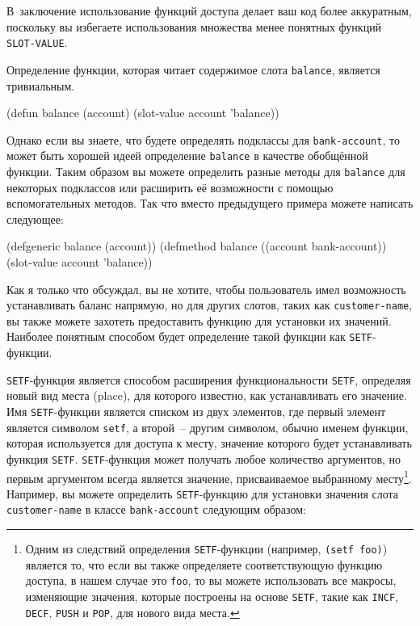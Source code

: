 В~заключение использование функций доступа делает ваш код более аккуратным, поскольку вы
избегаете использования множества менее понятных функций \lstinline{SLOT-VALUE}.

Определение функции, которая читает содержимое слота \lstinline{balance}, является тривиальным.

\begin{myverb}
(defun balance (account)
  (slot-value account 'balance))
\end{myverb}

Однако если вы знаете, что будете определять подклассы для \lstinline{bank-account}, то
может быть хорошей идеей определение \lstinline{balance} в качестве обобщённой функции.  Таким
образом вы можете определить разные методы для \lstinline{balance} для некоторых подклассов
или расширить её возможности с помощью вспомогательных методов. Так что вместо предыдущего
примера можете написать следующее:

\begin{myverb}
(defgeneric balance (account))
(defmethod balance ((account bank-account))
  (slot-value account 'balance))
\end{myverb}

Как я только что обсуждал, вы не хотите, чтобы пользователь имел возможность устанавливать
баланс напрямую, но для других слотов, таких как \lstinline{customer-name}, вы также можете
захотеть предоставить функцию для установки их значений.  Наиболее понятным способом будет
определение такой функции как \lstinline{SETF}-функции.

\lstinline{SETF}-функция является способом расширения функциональности \lstinline{SETF}, определяя
новый вид места (place), для которого известно, как устанавливать его значение.  Имя
\lstinline{SETF}-функции является списком из двух элементов, где первый элемент является
символом \lstinline{setf}, а второй~-- другим символом, обычно именем функции, которая
используется для доступа к месту, значение которого будет устанавливать функция
\lstinline{SETF}.  \lstinline{SETF}-функция может получать любое количество аргументов, но первым
аргументом всегда является значение, присваиваемое выбранному месту\footnote{Одним из
  следствий определения \lstinline{SETF}-функции (например, \lstinline{(setf foo)}) является то, что
  если вы также определяете соответствующую функцию доступа, в нашем случае это
  \lstinline{foo}, то вы можете использовать все макросы, изменяющие значения, которые построены
  на основе \lstinline{SETF}, такие как \lstinline{INCF}, \lstinline{DECF}, \lstinline{PUSH} и \lstinline{POP}, для
  нового вида места.}\hspace{\footnotenegspace}.  Например, вы можете определить \lstinline{SETF}-функцию для установки
значения слота \lstinline{customer-name} в классе \lstinline{bank-account} следующим образом:

